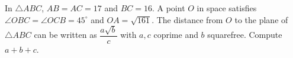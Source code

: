 In $\triangle ABC$, $AB=AC=17$ and $BC=16$. A point $O$ in space satisfies $\angle OBC=\angle OCB=45^\circ$ and $OA=\sqrt{161}$. The distance from $O$ to the plane of $\triangle ABC$ can be written as $\dfrac{a\sqrt b}{c}$ with $a,c$ coprime and $b$ squarefree. Compute $a+b+c$.
